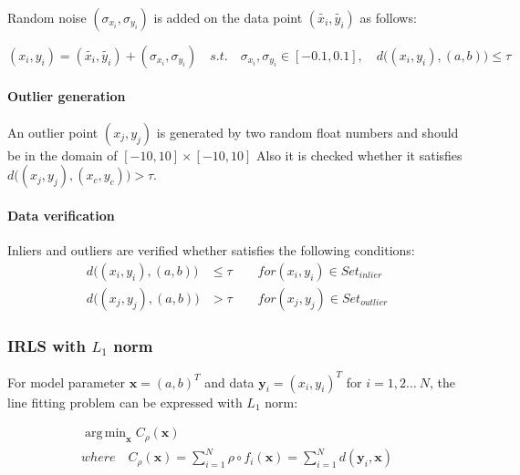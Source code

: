 \documentclass[paper=a4, fontsize=11pt]{scrartcl} %
\numberwithin{equation}{section} %
\numberwithin{figure}{section} %
\numberwithin{table}{section} %
\renewcommand{\vec}[1]{\mathbf{#1}}
\DeclareMathOperator*{\argmin}{arg\,min} %
\begin{document}
Random noise $(\sigma_{x_{i}}, \sigma_{y_{i}})$ is added on the data point $(\tilde{x_{i}}, \tilde{y_{i}})$ as follows:

\begin{equation*}
(x_{i}, y_{i}) = (\tilde{x_{i}}, \tilde{y_{i}}) + (\sigma_{x_{i}}, \sigma_{y_{i}}) \quad
s.t. \quad \sigma_{x_{i}}, \sigma_{y_{i}} \in [-0.1, 0.1], \quad d \big( (x_{i}, y_{i}), (a, b) \big) \leq \tau 
\end{equation*}


\paragraph{Outlier generation}

An outlier point $(x_{j}, y_{j})$ is generated by two random float numbers and should be in the domain of $[-10, 10] \times [-10, 10]$ Also it is checked whether it satisfies $d \big( (x_{j}, y_{j}), (x_{c}, y_{c}) \big) > \tau$. 

\paragraph{Data verification}

Inliers and outliers are verified whether satisfies the following conditions:
\begin{align*}
d \big( (x_{i}, y_{i}), (a, b) \big) &\leq \tau  \qquad for (x_{i}, y_{i}) \in Set_{inlier} \\
d \big( (x_{j}, y_{j}), (a, b) \big) &> \tau \qquad for (x_{j}, y_{j}) \in Set_{outlier} 
\end{align*}

\subsubsection{IRLS with $L_{1}$ norm}

For model parameter $\vec{x} = (a, b)^{T}$ and data $\vec{y}_{i} = (x_{i}, y_{i})^{T}$ for $i = 1, 2 \dots\ N$, the line fitting problem can be expressed with $L_{1}$ norm:

\begin{gather*}
\argmin_{\vec{x}} C_{\rho}(\vec{x}) \\ 
where \quad C_{\rho}(\vec{x}) = \sum_{i=1}^{N} \rho \circ f_{i}(\vec{x}) = \sum_{i=1}^{N} d(\vec{y}_{i}, \vec{x}) \\
\end{gather*}
\end{document}
